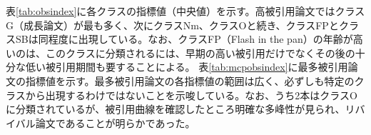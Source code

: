 表\ref{tab:obsindex}に各クラスの指標値（中央値）を示す。高被引用論文ではクラスG（成長論文）が最も多く、次にクラスNm、クラスOと続き、クラスFPとクラスSBは同程度に出現している。なお、クラスFP（Flash in the pan）の年齢が高いのは、このクラスに分類されるには、早期の高い被引用だけでなくその後の十分な低い被引用期間も要することによる。
表\ref{tab:mcpobsindex}に最多被引用論文の指標値を示す。最多被引用論文の各指標値の範囲は広く、必ずしも特定のクラスから出現するわけではないことを示唆している。なお、うち2本はクラスOに分類されているが、被引用曲線を確認したところ明確な多峰性が見られ、リバイバル論文であることが明らかであった。
